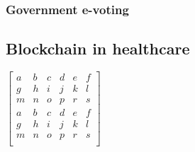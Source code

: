 \documentclass[10pt,english,a4paper]{article}
\begin{document}
\subsubsection{Government e-voting}
\lipsum[1]
\subsection{Blockchain in healthcare}
\lipsum[1]
 
 \lipsum[1-3]

 
 
 \lipsum[1-4]
 
$\begin{bmatrix}
  a & b & c & d & e &f\\
  g & h & i & j & k &l \\
  m & n & o & p & r &s\\
   a & b & c & d & e &f\\
  g & h & i & j & k &l \\
  m & n & o & p & r &s\\
  

  
\end{bmatrix}$



\newpage


\end{document}
